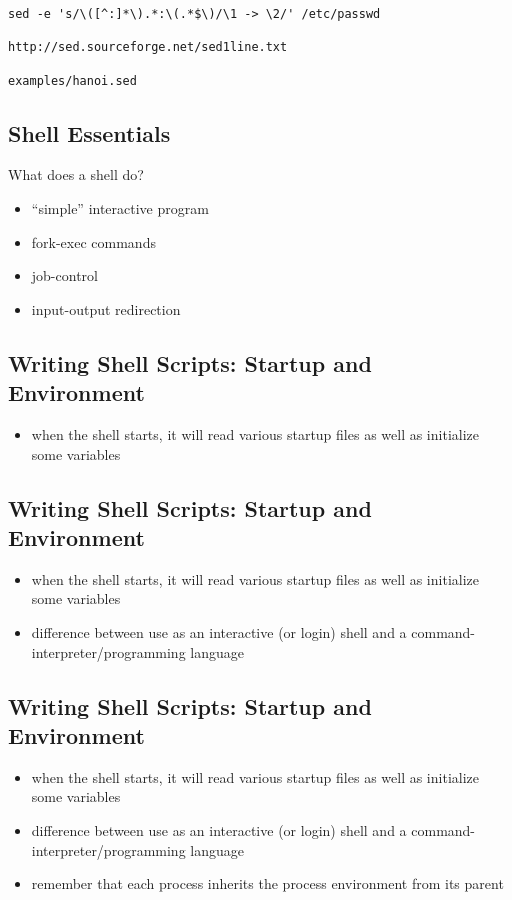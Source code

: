 \documentclass[xga]{xdvislides}
\begin{document}
\begin{verbatim}
sed -e 's/\([^:]*\).*:\(.*$\)/\1 -> \2/' /etc/passwd

http://sed.sourceforge.net/sed1line.txt

examples/hanoi.sed
\end{verbatim}


\subsection{Shell Essentials}
What does a shell do?
\begin{itemize}
	\item ``simple'' interactive program
	\item fork-exec commands
	\item job-control
	\item input-output redirection
\end{itemize}

\subsection{Writing Shell Scripts: Startup and Environment}
\begin{itemize}
	\item when the shell starts, it will read various startup files as
		well as initialize some variables
\end{itemize}

\subsection{Writing Shell Scripts: Startup and Environment}
\begin{itemize}
	\item when the shell starts, it will read various startup files as
		well as initialize some variables
	\item difference between use as an interactive (or login) shell and a
		command-interpreter/programming language
\end{itemize}

\subsection{Writing Shell Scripts: Startup and Environment}
\begin{itemize}
	\item when the shell starts, it will read various startup files as
		well as initialize some variables
	\item difference between use as an interactive (or login) shell and a
		command-interpreter/programming language
	\item remember that each process inherits the process environment
		from its parent
\end{itemize}
\end{document}
